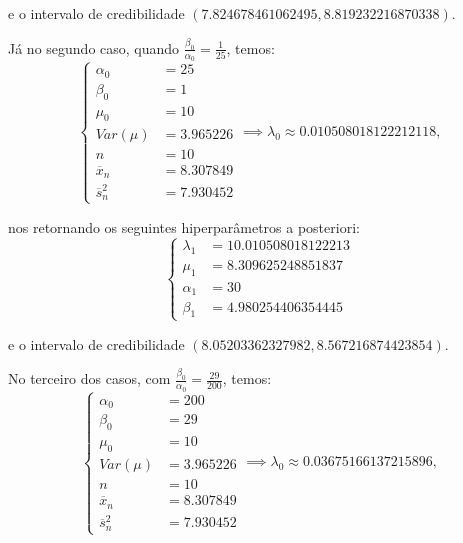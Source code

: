 \documentclass{article}
\begin{document}
\noindent e o intervalo de credibilidade $(7.824678461062495, 8.819232216870338)$.

Já no segundo caso, quando $\frac{\beta_0}{\alpha_0} = \frac{1}{25}$, temos:
\begin{equation*}
    \left\{
        \begin{array}{ll}
            \alpha_0 & = 25 \\
            \beta_0 & = 1 \\
            \mu_0 & = 10 \\
            Var(\mu) & = 3.965226 \\
            n & = 10 \\
            \overline{x}_n & = 8.307849 \\
            \overline{s}_n^2 & = 7.930452
        \end{array}
    \right.
    \implies \lambda_0 \approx 0.010508018122212118,
\end{equation*}

\noindent nos retornando os seguintes hiperparâmetros a posteriori:
\begin{equation*}
    \left\{
        \begin{array}{ll}
            \lambda_1 & = 10.010508018122213 \\
            \mu_1 & = 8.309625248851837 \\
            \alpha_1 & = 30 \\
            \beta_1 & = 4.980254406354445
        \end{array}
    \right.
\end{equation*}

\noindent e o intervalo de credibilidade $(8.05203362327982, 8.567216874423854)$.

No terceiro dos casos, com $\frac{\beta_0}{\alpha_0} = \frac{29}{200}$, temos:
\begin{equation*}
    \left\{
        \begin{array}{ll}
            \alpha_0 & = 200 \\
            \beta_0 & = 29 \\
            \mu_0 & = 10 \\
            Var(\mu) & = 3.965226 \\
            n & = 10 \\
            \overline{x}_n & = 8.307849 \\
            \overline{s}_n^2 & = 7.930452
        \end{array}
    \right.
    \implies \lambda_0 \approx 0.03675166137215896,
\end{equation*}
\end{document}
